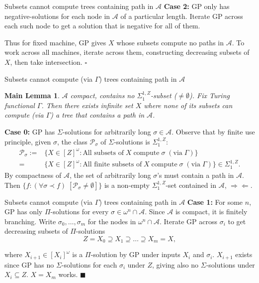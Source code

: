 \begin{frame}{Subsets cannot compute trees containing path in $\mathcal{A}$}
  \textbf{Case 2:} GP only has negative-solutions for each node in
  $\mathcal{A}$ of a particular length. Iterate GP across each such node to
  get a solution that is negative for all of them.

  \vspace{1em}
  Thus for fixed machine, GP gives $X$ whose subsets compute no paths in
  $\mathcal{A}$. To work across all machines, iterate across them,
  constructing decreasing subsets of $X$, then take intersection. $\square$
\end{frame}

\begin{frame}{Subsets cannot compute (via $\Gamma$) trees containing path
in $\mathcal{A}$}
  \newtheorem*{main-lemma*}{Main Lemma}
  \begin{main-lemma*}
    \label{lemma:fixed-machine}
    $\mathcal{A}$ compact, contains no $\Sigma_1^{1,Z}$-subset
    ($\neq\emptyset$). Fix Turing functional $\Gamma$. Then there exists
    infinite set $X$ where none of its subsets can compute (via $\Gamma$) a
    tree that contains a path in $\mathcal{A}$.
  \end{main-lemma*}

  \vspace{0.5em}
  \textbf{Case 0:} GP has $\Sigma$-solutions for arbitrarily long
  $\sigma\in\mathcal{A}$. Observe that by finite use principle, given
  $\sigma$, the class $\mathcal{P}_{\sigma}$ of $\Sigma$-solutions is
  $\Sigma_1^{1,Z}$:
  \begin{align*}
    \mathcal{P}_{\sigma}:= &\{X\in[Z]^\omega: \text{All subsets of}\; X\;
      \text{compute}\; \sigma\; (\text{via}\; \Gamma)\}\\
    =&\{X\in[Z]^\omega: \text{All finite subsets of}\; X\;
      \text{compute}\; \sigma\; (\text{via}\; \Gamma)\}
      \in\Sigma_1^{1,Z}.
  \end{align*}
  By compactness of $\mathcal{A}$, the set of arbitrarily long $\sigma$'s
  must contain a path in $\mathcal{A}$. Then $\{f:(\forall \sigma\prec f)\;
  [\mathcal{P}_\sigma \neq \emptyset]\}$ is a non-empty
  $\Sigma_1^{1,Z}$-set contained in $\mathcal{A}$, $\Rightarrow\Leftarrow$.
\end{frame}

\begin{frame}{Subsets cannot compute (via $\Gamma$) trees containing path
in $\mathcal{A}$}
  \textbf{Case 1:} For some $n$, GP has only $\Pi$-solutions for every
  $\sigma\in\omega^n\cap\mathcal{A}$. Since $\mathcal{A}$ is compact, it is
  finitely branching. Write $\sigma_0,\ldots,\sigma_m$ for the
  nodes in $\omega^n\cap\mathcal{A}$. Iterate GP across $\sigma_i$ to get
  decreasing subsets of $\Pi$-solutions
  \[Z=X_0 \supseteq X_1 \supseteq \ldots\supseteq X_m=X,\]

  where $X_{i+1}\in[X_i]^\omega$ is a $\Pi$-solution by GP under
  inputs $X_i$ and $\sigma_i$. $X_{i+1}$ exists since GP has no
  $\Sigma$-solutions for each $\sigma_i$ under $Z$, giving also no
  $\Sigma$-solutions under $X_i\subseteq Z$. $X=X_m$ works. $\blacksquare$
\end{frame}

